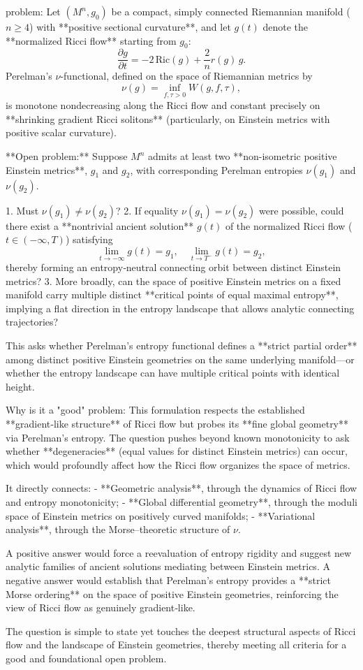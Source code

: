 problem:  
Let \( (M^n, g_0) \) be a compact, simply connected Riemannian manifold (\(n \ge 4\)) with **positive sectional curvature**, and let \(g(t)\) denote the **normalized Ricci flow** starting from \(g_0\):  
\[
\frac{\partial g}{\partial t} = -2\,\mathrm{Ric}(g) + \frac{2}{n}r(g)\,g.
\]  
Perelman’s \(\nu\)-functional, defined on the space of Riemannian metrics by  
\[
\nu(g) = \inf_{f,\tau>0} W(g,f,\tau),
\]  
is monotone nondecreasing along the Ricci flow and constant precisely on **shrinking gradient Ricci solitons** (particularly, on Einstein metrics with positive scalar curvature).  

**Open problem:**  
Suppose \(M^n\) admits at least two **non-isometric positive Einstein metrics**, \(g_1\) and \(g_2\), with corresponding Perelman entropies \(\nu(g_1)\) and \(\nu(g_2)\).  

1. Must \(\nu(g_1) \neq \nu(g_2)\)?  
2. If equality \(\nu(g_1) = \nu(g_2)\) were possible, could there exist a **nontrivial ancient solution** \(g(t)\) of the normalized Ricci flow (\(t\in(-\infty,T)\)) satisfying
   \[
   \lim_{t\to -\infty} g(t)=g_1, \quad \lim_{t\to T^-} g(t)=g_2,
   \]
   thereby forming an entropy‑neutral connecting orbit between distinct Einstein metrics?  
3. More broadly, can the space of positive Einstein metrics on a fixed manifold carry multiple distinct **critical points of equal maximal entropy**, implying a flat direction in the entropy landscape that allows analytic connecting trajectories?  

This asks whether Perelman’s entropy functional defines a **strict partial order** among distinct positive Einstein geometries on the same underlying manifold—or whether the entropy landscape can have multiple critical points with identical height.

Why is it a "good" problem:  
This formulation respects the established **gradient‑like structure** of Ricci flow but probes its **fine global geometry** via Perelman’s entropy. The question pushes beyond known monotonicity to ask whether **degeneracies** (equal values for distinct Einstein metrics) can occur, which would profoundly affect how the Ricci flow organizes the space of metrics.  

It directly connects:  
- **Geometric analysis**, through the dynamics of Ricci flow and entropy monotonicity;  
- **Global differential geometry**, through the moduli space of Einstein metrics on positively curved manifolds;  
- **Variational analysis**, through the Morse–theoretic structure of \(\nu\).  

A positive answer would force a reevaluation of entropy rigidity and suggest new analytic families of ancient solutions mediating between Einstein metrics. A negative answer would establish that Perelman’s entropy provides a **strict Morse ordering** on the space of positive Einstein geometries, reinforcing the view of Ricci flow as genuinely gradient‑like.  

The question is simple to state yet touches the deepest structural aspects of Ricci flow and the landscape of Einstein geometries, thereby meeting all criteria for a good and foundational open problem.